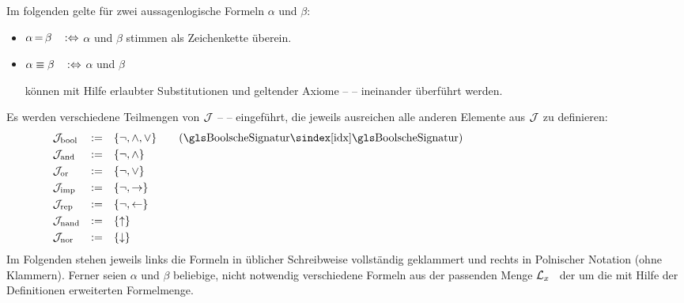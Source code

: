 Im folgenden gelte für zwei aussagenlogische Formeln $\alpha$ und $\beta$:
\begin{itemize}
	\item[] $\alpha \operatorname{=}    \beta \quad \operatorname{:\!\operatorname{\Leftrightarrow}}$ \quad $\alpha$ und $\beta$
	stimmen als Zeichenkette überein.
	\item[] $\alpha \equiv \beta \quad \operatorname{:\!\operatorname{\Leftrightarrow}}$ \quad $\alpha$ und $\beta$
	\parbox[t]{11cm}{können mit Hilfe erlaubter Substitutionen und geltender Axiome --  -- ineinander überführt werden.}
\end{itemize}
%
Es werden verschiedene Teilmengen von $\mathcal{J}$ --  -- eingeführt, die jeweils ausreichen alle anderen Elemente aus $\mathcal{J}$ zu definieren:
\begin{align}
	& \alJun_\xBool & \defeq & \quad\{ \lnot, \land, \lor \} \label{def:Jbool}
	\qquad (\text{\glsIdx{BoolscheSignatur}})
	\\
	& \alJun_\xAnd  & \defeq & \quad\{ \lnot, \land       \} \label{def:Jand}
	\\
	& \alJun_\xOr   & \defeq & \quad\{ \lnot, \lor        \} \label{def:Jor}
	\\
	& \alJun_\xImp  & \defeq & \quad\{ \lnot, \limp       \} \label{def:Jimp}
	\\
	& \alJun_\xRep  & \defeq & \quad\{ \lnot, \lrep       \} \label{def:Jrep}
	\\
	& \alJun_\xNand & \defeq & \quad\{ \lnand             \} \label{def:Jnand}
	\\
	& \alJun_\xNor  & \defeq & \quad\{ \lnor              \} \label{def:Jnor}
	\formulatoleft\formulatoleft\formulatoleft
\end{align}
%
Im Folgenden stehen jeweils links die Formeln in üblicher Schreibweise vollständig geklammert und rechts in Polnischer Notation (ohne Klammern).
Ferner seien $\alpha$ und $\beta$ beliebige, nicht notwendig verschiedene Formeln aus der passenden Menge $\mathcal{L}_x$ \textbzgl\ der um die mit Hilfe der Definitionen erweiterten Formelmenge.

